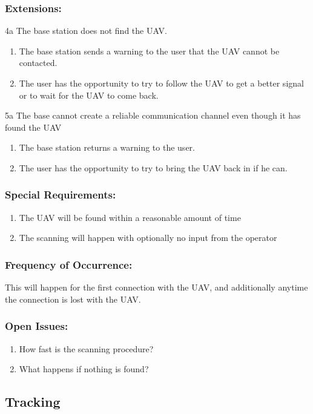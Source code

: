 \documentclass[ProductRequirements.tex]{subfiles}
\begin{document}
		\subsubsection*{Extensions:}
		4a The base station does not find the UAV.
		\begin{enumerate}
			\item The base station sends a warning to the user that the UAV cannot be contacted.
			\item The user has the opportunity to try to follow the UAV to get a better signal or to wait for the UAV to come back.
		\end{enumerate}
		5a The base cannot create a reliable communication channel even though it has found the UAV
		\begin{enumerate}
			\item The base station returns a warning to the user.
			\item The user has the opportunity to try to bring the UAV back in if he can.
		\end{enumerate}
		\subsubsection*{Special Requirements:}
			\begin{enumerate}\itemsep1pt
				\item The UAV will be found within a reasonable amount of time
				\item The scanning will happen with optionally no input from the operator
			\end{enumerate}
		\subsubsection*{Frequency of Occurrence:}
			This will happen for the first connection with the UAV, and additionally anytime the connection is lost with the UAV.
		\subsubsection*{Open Issues:}
			\begin{enumerate}\itemsep1pt
				\item How fast is the scanning procedure?
				\item What happens if nothing is found?
			\end{enumerate}		
	
	\subsection{Tracking}
\end{document}

